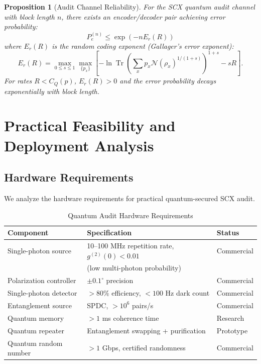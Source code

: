 \documentclass[11pt,a4paper]{article}
\theoremstyle{plain}
\newtheorem{proposition}[theorem]{Proposition}
\theoremstyle{definition}
\theoremstyle{remark}
\DeclareMathOperator{\Tr}{Tr}
\newcommand{\cN}{\mathcal{N}}
\begin{document}
\begin{proposition}[Audit Channel Reliability]
\label{prop:reliability}
For the SCX quantum audit channel with block length $n$, there exists an
encoder/decoder pair achieving error probability:
\[
P_e^{(n)} \leq \exp(-n E_r(R))
\]
where $E_r(R)$ is the random coding exponent (Gallager's error exponent):
\[
E_r(R) = \max_{0 \leq s \leq 1} \max_{\{p_x\}} \left[
-\ln \Tr\left(\sum_x p_x \cN(\rho_x)^{1/(1+s)}\right)^{1+s} - sR
\right].
\]
For rates $R < C_Q(p)$, $E_r(R) > 0$ and the error probability decays
exponentially with block length.
\end{proposition}

\section{Practical Feasibility and Deployment Analysis}
\label{sec:practical}

\subsection{Hardware Requirements}

We analyze the hardware requirements for practical quantum-secured SCX audit.

\begin{table}[H]
\centering
\caption{Quantum Audit Hardware Requirements}
\label{tab:hardware}
\begin{tabular}{@{}lll@{}}
\toprule
\textbf{Component} & \textbf{Specification} & \textbf{Status} \\
\midrule
Single-photon source & 10--100 MHz repetition rate, $g^{(2)}(0) < 0.01$ & Commercial \\
& (low multi-photon probability) & \\
\midrule
Polarization controller & $\pm 0.1^\circ$ precision & Commercial \\
\midrule
Single-photon detector & $> 80\%$ efficiency, $< 100$ Hz dark count & Commercial \\
\midrule
Entanglement source & SPDC, $> 10^6$ pairs/s & Commercial \\
\midrule
Quantum memory & $> 1$ ms coherence time & Research \\
\midrule
Quantum repeater & Entanglement swapping + purification & Prototype \\
\midrule
Quantum random number & $> 1$ Gbps, certified randomness & Commercial \\
\bottomrule
\end{tabular}
\end{table}
\end{document}
